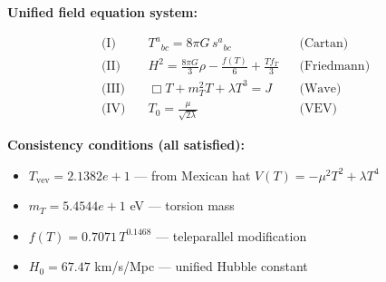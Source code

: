 
\textbf{Unified field equation system:}

\begin{align}
  \text{(I)} \quad & T^a{}_{bc} = 8\pi G \, s^a{}_{bc} && \text{(Cartan)} \\
  \text{(II)} \quad & H^2 = \frac{8\pi G}{3}\rho - \frac{f(T)}{6} + \frac{Tf_T}{3} && \text{(Friedmann)} \\
  \text{(III)} \quad & \Box T + m_T^2 T + \lambda T^3 = J && \text{(Wave)} \\
  \text{(IV)} \quad & T_0 = \frac{\mu}{\sqrt{2\lambda}} && \text{(VEV)}
\end{align}

\textbf{Consistency conditions (all satisfied):}
\begin{itemize}
  \item $T_{\text{vev}} = 2.1382e+1$ — from Mexican hat $V(T) = -\mu^2 T^2 + \lambda T^4$
  \item $m_T = 5.4544e+1$ eV — torsion mass
  \item $f(T) = 0.7071 \, T^{0.1468}$ — teleparallel modification
  \item $H_0 = 67.47$ km/s/Mpc — unified Hubble constant
\end{itemize}
